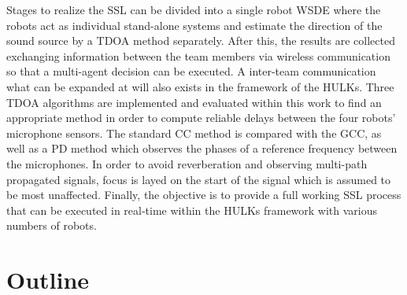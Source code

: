 Stages to realize the \ac{SSL} can be divided into a single robot \ac{WSDE} where
the robots act as individual stand-alone systems and estimate the direction of the
sound source by a \ac{TDOA} method separately.
After this, the results are collected exchanging information between the
team members via wireless communication so that a multi-agent decision can be executed.
A inter-team communication what can be expanded at will also exists in the framework of the HULKs.
Three \ac{TDOA} algorithms are implemented and evaluated within this work
to find an appropriate method in order to compute reliable delays between the four robots'
microphone sensors.
The standard \acf{CC} method is compared with the \acf{GCC}, as well as a \ac{PD} method which
observes the phases of a reference frequency between the microphones.
In order to avoid reverberation and observing multi-path propagated signals, focus is layed on the
start of the signal which is assumed to be most unaffected.
Finally, the objective is to provide a full working \ac{SSL} process that can be executed
in real-time within the HULKs framework with various numbers of robots.


\section{Outline}
\label{sec:01_outline}


